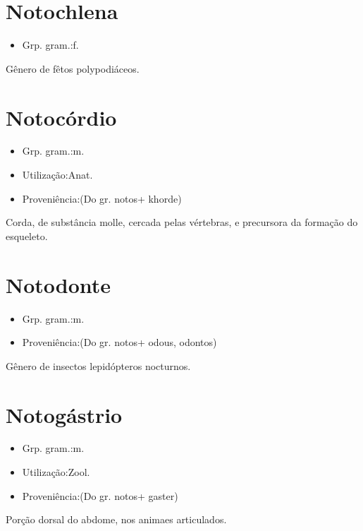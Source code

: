 \section{Notochlena}
\begin{itemize}
\item {Grp. gram.:f.}
\end{itemize}
Gênero de fêtos polypodiáceos.
\section{Notocórdio}
\begin{itemize}
\item {Grp. gram.:m.}
\end{itemize}
\begin{itemize}
\item {Utilização:Anat.}
\end{itemize}
\begin{itemize}
\item {Proveniência:(Do gr. \textunderscore notos\textunderscore  + \textunderscore khorde\textunderscore )}
\end{itemize}
Corda, de substância molle, cercada pelas vértebras, e precursora da formação do esqueleto.
\section{Notodonte}
\begin{itemize}
\item {Grp. gram.:m.}
\end{itemize}
\begin{itemize}
\item {Proveniência:(Do gr. \textunderscore notos\textunderscore  + \textunderscore odous\textunderscore , \textunderscore odontos\textunderscore )}
\end{itemize}
Gênero de insectos lepidópteros nocturnos.
\section{Notogástrio}
\begin{itemize}
\item {Grp. gram.:m.}
\end{itemize}
\begin{itemize}
\item {Utilização:Zool.}
\end{itemize}
\begin{itemize}
\item {Proveniência:(Do gr. \textunderscore notos\textunderscore  + \textunderscore gaster\textunderscore )}
\end{itemize}
Porção dorsal do abdome, nos animaes articulados.

